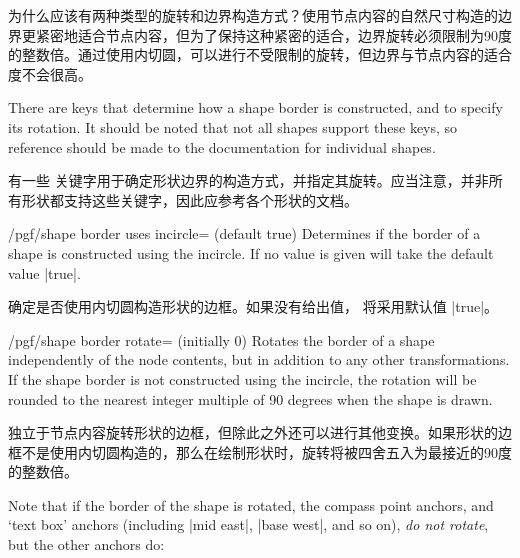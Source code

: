 为什么应该有两种类型的旋转和边界构造方式？使用节点内容的自然尺寸构造的边界更紧密地适合节点内容，但为了保持这种紧密的适合，边界旋转必须限制为90度的整数倍。通过使用内切圆，可以进行不受限制的旋转，但边界与节点内容的适合度不会很高。

\begin{codeexample}[preamble={\usetikzlibrary{shapes.geometric}}]
\end{codeexample}

There are \pgfname{} keys that determine how a shape border is constructed, and
to specify its rotation. It should be noted that not all shapes support these
keys, so reference should be made to the documentation for individual shapes.

有一些\pgfname{} 关键字用于确定形状边界的构造方式，并指定其旋转。应当注意，并非所有形状都支持这些关键字，因此应参考各个形状的文档。


\begin{key}{/pgf/shape border uses incircle= (default true)}
    Determines if the border of a shape is constructed using the incircle. If
    no value is given  will take the default value |true|.

    确定是否使用内切圆构造形状的边框。如果没有给出值， 将采用默认值 |true|。


\end{key}

\begin{key}{/pgf/shape border rotate= (initially 0)}
    Rotates the border of a shape independently of the node contents, but in
    addition to any other transformations. If the shape border is not
    constructed using the incircle, the rotation will be rounded to the nearest
    integer multiple of 90 degrees when the shape is drawn.

    独立于节点内容旋转形状的边框，但除此之外还可以进行其他变换。如果形状的边框不是使用内切圆构造的，那么在绘制形状时，旋转将被四舍五入为最接近的90度的整数倍。
\end{key}

Note that if the border of the shape is rotated, the compass point anchors, and
`text box' anchors (including |mid east|, |base west|, and so on), \emph{do not
rotate}, but the other anchors do:


